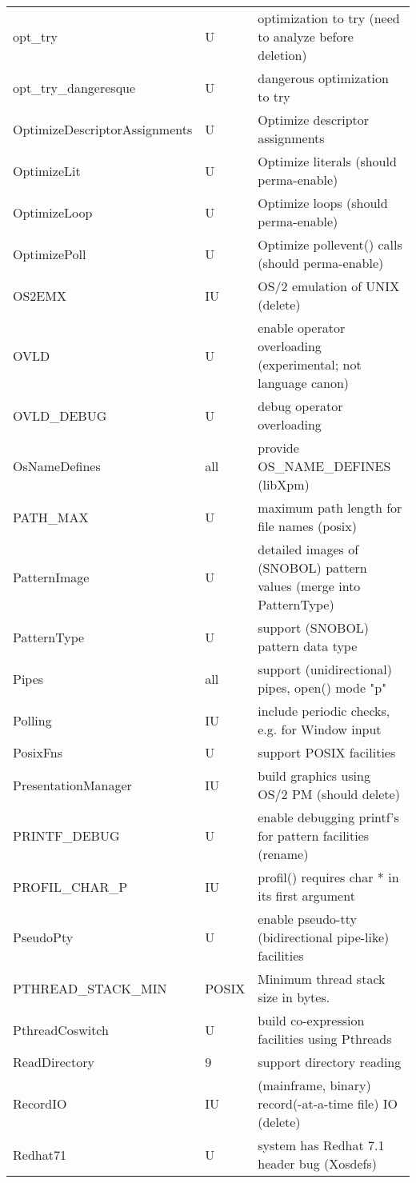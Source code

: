 \begin{xtabular}{|m{1.8in}|m{0.5in}|m{4.0in}|}
opt\_try & U & optimization to try (need to analyze before deletion) \\
opt\_try\_dangeresque & U & dangerous optimization to try  \\
OptimizeDescriptorAssignments & U & Optimize descriptor assignments \\
OptimizeLit & U & Optimize literals (should perma-enable) \\
OptimizeLoop & U & Optimize loops (should perma-enable) \\
OptimizePoll & U & Optimize pollevent() calls (should perma-enable) \\
OS2EMX & IU & OS/2 emulation of UNIX (delete) \\
OVLD & U & enable operator overloading (experimental; not language canon) \\
OVLD\_DEBUG & U & debug operator overloading \\
OsNameDefines & all & provide OS\_NAME\_DEFINES (libXpm) \\
PATH\_MAX & U & maximum path length for file names (posix) \\
PatternImage & U & detailed images of (SNOBOL) pattern values (merge into PatternType) \\
PatternType & U & support (SNOBOL) pattern data type \\
Pipes & all & support (unidirectional) pipes, open() mode "p" \\
Polling & IU & include periodic checks, e.g. for Window input \\
PosixFns & U & support POSIX facilities \\
PresentationManager & IU & build graphics using OS/2 PM (should delete) \\
PRINTF\_DEBUG & U & enable debugging printf's for pattern facilities (rename) \\
PROFIL\_CHAR\_P & IU & profil() requires char * in its first argument \\
PseudoPty & U & enable pseudo-tty (bidirectional pipe-like) facilities \\
PTHREAD\_STACK\_MIN & POSIX & Minimum thread stack size in bytes. \\
PthreadCoswitch & U & build co-expression facilities using Pthreads \\
ReadDirectory & 9 & support directory reading \\
RecordIO & IU & (mainframe, binary) record(-at-a-time file) IO (delete) \\
Redhat71 & U & system has Redhat 7.1 header bug (Xosdefs) \\

\end{xtabular}
